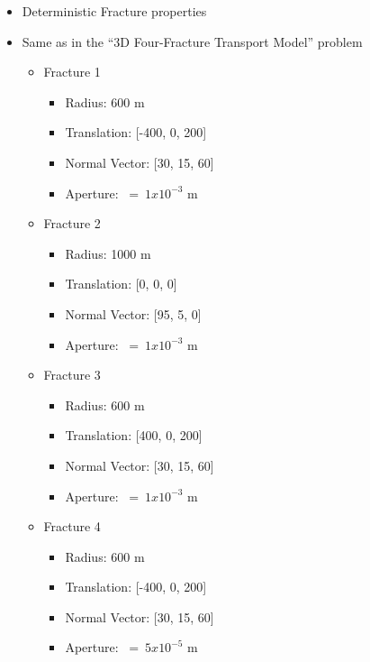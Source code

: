 \documentclass{beamer}
\newcommand{\eq}{\ =\ }
\begin{document}
\begin{frame}
	\begin{itemize}
		\item Deterministic Fracture properties
		\item Same as in the ``3D Four-Fracture Transport Model''  problem
		\begin{itemize}
			\footnotesize
			\item Fracture 1
			\begin{itemize}
				\item Radius: 600 m
				\item Translation: [-400, 0, 200]
				\item Normal Vector: [30, 15, 60]
				\item Aperture: $\eq 1x10^{-3}$ m
			\end{itemize}
			\item Fracture 2
			\begin{itemize}
				\item Radius: 1000 m
				\item Translation: [0, 0, 0]
				\item Normal Vector: [95, 5, 0]
				\item Aperture: $\eq 1x10^{-3}$ m
			\end{itemize}
			\item Fracture 3
			\begin{itemize}
				\item Radius: 600 m
				\item Translation: [400, 0, 200]
				\item Normal Vector: [30, 15, 60]
				\item Aperture: $\eq 1x10^{-3}$ m
			\end{itemize}
			\item Fracture 4
			\begin{itemize}
				\item Radius: 600 m
				\item Translation: [-400, 0, 200]
				\item Normal Vector: [30, 15, 60]
				\item Aperture: $\eq 5x10^{-5}$ m
			\end{itemize}
		\end{itemize}
	\end{itemize}
	

\end{frame}
\end{document}
